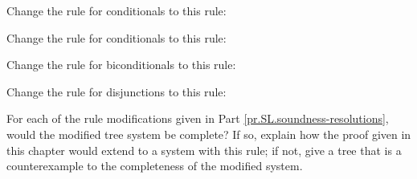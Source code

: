 \begin{earg}
\item Change the rule for conditionals to this rule:

\item Change the rule for conditionals to this rule:

\item Change the rule for biconditionals to this rule:

\item Change the rule for disjunctions to this rule:

\end{earg}

\problempart
\label{pr.SL.completenessresolutions}
For each of the rule modifications given in Part \ref{pr.SL.soundness-resolutions}, would the modified tree system be complete? If so, explain how the proof given in this chapter would extend to a system with this rule; if not, give a tree that is a counterexample to the completeness of the modified system.

\fi 
